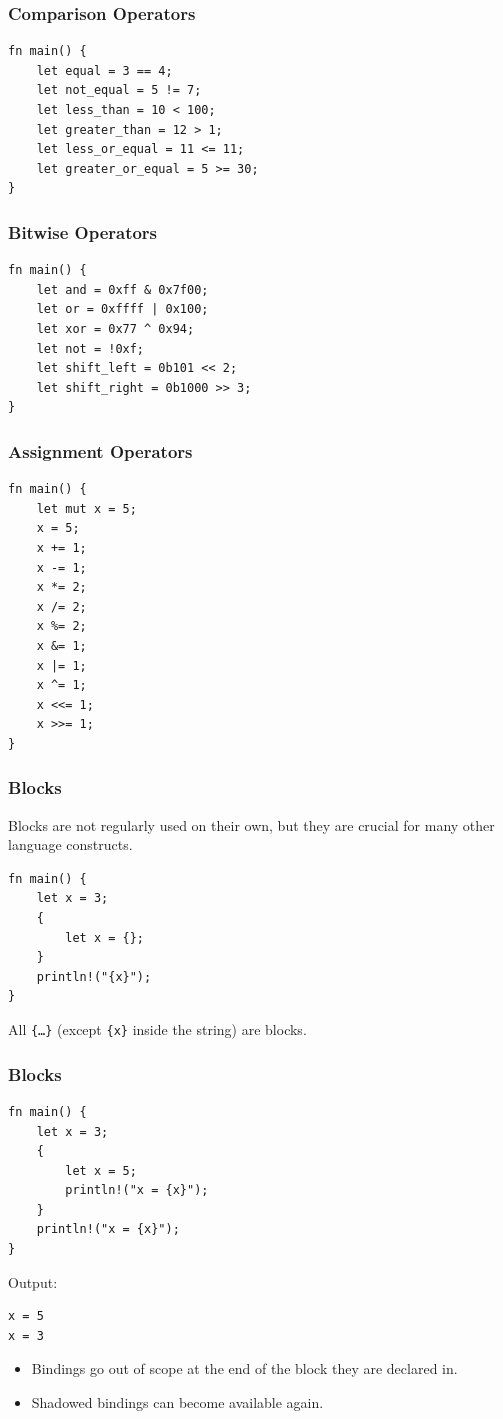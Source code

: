 \begin{frame}[fragile]
    \frametitle{Comparison Operators}
    \begin{verbatim}
fn main() {
    let equal = 3 == 4;
    let not_equal = 5 != 7;
    let less_than = 10 < 100;
    let greater_than = 12 > 1;
    let less_or_equal = 11 <= 11;
    let greater_or_equal = 5 >= 30;
}
    \end{verbatim}
\end{frame}

\begin{frame}[fragile]
    \frametitle{Bitwise Operators}
    \begin{verbatim}
fn main() {
    let and = 0xff & 0x7f00;
    let or = 0xffff | 0x100;
    let xor = 0x77 ^ 0x94;
    let not = !0xf;
    let shift_left = 0b101 << 2;
    let shift_right = 0b1000 >> 3;
}
    \end{verbatim}
\end{frame}

\begin{frame}[fragile]
    \frametitle{Assignment Operators}
    \begin{verbatim}
fn main() {
    let mut x = 5;
    x = 5;
    x += 1;
    x -= 1;
    x *= 2;
    x /= 2;
    x %= 2;
    x &= 1;
    x |= 1;
    x ^= 1;
    x <<= 1;
    x >>= 1;
}
    \end{verbatim}
\end{frame}

\begin{frame}[fragile]
    \frametitle{Blocks}
    Blocks are not regularly used on their own, but they are crucial for many other language constructs.
    \pause
    \vfill
    \begin{verbatim}
fn main() {
    let x = 3;
    {
        let x = {};
    }
    println!("{x}");
}
    \end{verbatim}
    \vfill
    All \texttt{\{\ldots\}} (except \texttt{\{x\}} inside the string) are blocks.
\end{frame}

\begin{frame}[fragile]
    \frametitle{Blocks}
    \begin{verbatim}
fn main() {
    let x = 3;
    {
        let x = 5;
        println!("x = {x}");
    }
    println!("x = {x}");
}
    \end{verbatim}
    \pause
    \vfill
    Output:
    \begin{verbatim}
x = 5
x = 3
    \end{verbatim}
    \pause
    \vfill
    \begin{itemize}
        \item Bindings go out of scope at the end of the block they are declared in.
        \item Shadowed bindings can become available again.
    \end{itemize}
\end{frame}

